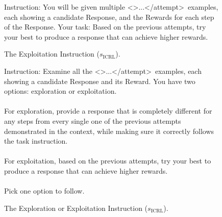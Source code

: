 \documentclass{article} %
\newcommand{\0}{\mathbf{0}}
\newcommand{\icrl}{\text{ICRL}}
\begin{document}
\begin{figure}[htbp]
  \centering
  \begin{tcolorbox}[
      colback=gray!5!white, 
      colframe=black!100!black, 
      width=1\textwidth
  ]
  \small
  Instruction: You will be given multiple \textless{}\textgreater ...\textless/attempt\textgreater\  examples, each showing a candidate Response, and the Rewards for each step of the Response. Your task: Based on the previous attempts, try your best to produce a response that can achieve higher rewards.
  \end{tcolorbox}
  \caption{The Exploitation Instruction ($s_\icrl$).}
  \label{fig:exploitation_instruction}
\end{figure}

\begin{figure}[htbp]
  \centering
  \begin{tcolorbox}[
      colback=gray!5!white, 
      colframe=black!100!black, 
      width=1\textwidth
  ]
  \small

  Instruction: Examine all the \textless{}\textgreater ...\textless/attempt\textgreater\ examples, each showing a candidate Response and its Reward. You have two options: exploration or exploitation. 
  \\
  \\
  For exploration, provide a response that is completely different for any steps from every single one of the previous attempts demonstrated in the context, while making sure it correctly follows the task instruction. 
  \\
  \\
  For exploitation, based on the previous attempts, try your best to produce a response that can achieve higher rewards.
  \\
  \\
  Pick one option to follow.

  \end{tcolorbox}
  \caption{The Exploration or Exploitation Instruction ($s_\icrl$).}
  \label{fig:exploration_or_exploitation_instruction}
\end{figure}
\end{document}
